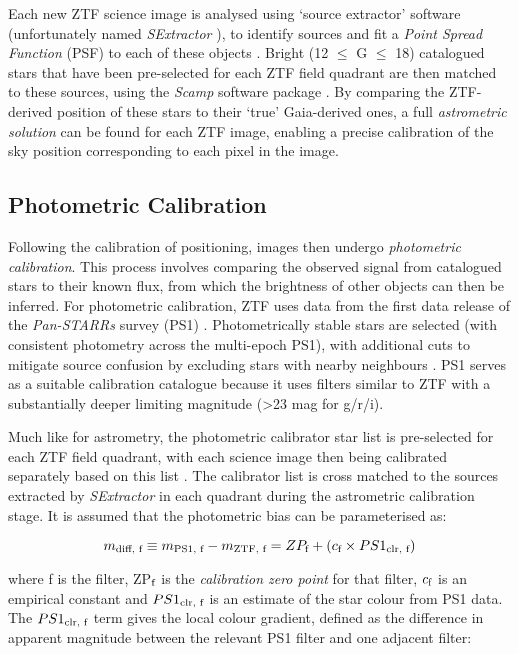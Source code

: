 Each new ZTF science image is analysed using `source extractor' software (unfortunately named \emph{SExtractor} ), to identify sources and fit a \emph{Point Spread Function} (PSF) to each of these objects \cite{ztf_data_processing}. Bright (12 $\leq$ G $\leq$ 18) catalogued stars that have been pre-selected for each ZTF field quadrant are then matched to these sources, using the \emph{Scamp} software package . By comparing the ZTF-derived position of these stars to their `true' Gaia-derived ones, a full \emph{astrometric solution} can be found for each ZTF image, enabling a precise calibration of the sky position corresponding to each pixel in the image.

\subsection*{Photometric Calibration}

Following the calibration of positioning, images then undergo \emph{photometric calibration}. This process involves comparing the observed signal from catalogued stars to their known flux, from which the brightness of other objects can then be inferred. For photometric calibration, ZTF uses data from the first data release of the \emph{Pan-STARRs} survey (PS1) . Photometrically stable stars are selected (with consistent photometry across the multi-epoch PS1), with additional cuts to mitigate source confusion by excluding stars with nearby neighbours \cite{ztf_data_processing}. PS1 serves as a suitable calibration catalogue because it uses filters similar to ZTF with a substantially deeper limiting magnitude (>23 mag for g/r/i).

Much like for astrometry, the photometric calibrator star list is pre-selected for each ZTF field quadrant, with each science image then being calibrated separately based on this list \cite{ztf_data_processing}.  The calibrator list is cross matched to the sources extracted by \emph{SExtractor} in each quadrant during the astrometric calibration stage. It is assumed that the photometric bias can be parameterised as:

\begin{equation}
	m_{\textup{diff, f}} \equiv m_{\textup{PS1, f}} - m_{\textup{ZTF, f}} = ZP_{\textup{f}} + \left( c_{\textup{f}} \times PS1_{\textup{clr, f}} \right)
	\label{eq:photmetric_calibration}
\end{equation}

where f is the filter, ZP$_{\textup{f}}$ is the \emph{calibration zero point} for that filter, $c_{\textup{f}}$ is an empirical constant and $PS1_{\textup{clr, f}}$ is an estimate of the star colour from PS1 data. The $PS1_{\textup{clr, f}}$ term gives the local colour gradient, defined as the difference in apparent magnitude between the relevant PS1 filter and one adjacent filter:

